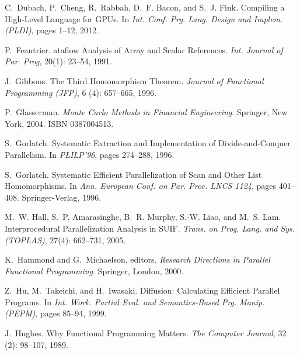 \documentclass{sigplanconf}  %
\begin{document}
\begin{thebibliography}{49}
C.~Dubach, P.~Cheng, R.~Rabbah, D.~F. Bacon, and S.~J. Fink.
\newblock Compiling a {H}igh-{L}evel {L}anguage for {GPU}s.
\newblock In \emph{Int. Conf. Prg. Lang. Design and Implem. (PLDI)}, pages
  1--12, 2012.

P.~Feautrier.
ataflow {A}nalysis of {A}rray and {S}calar {R}eferences.
\newblock \emph{Int. Journal of Par. Prog}, 20(1): 23--54, 1991.

J.~Gibbons.
\newblock The {T}hird {H}omomorphism {T}heorem.
\newblock \emph{Journal of Functional Programming (JFP)}, 6
  (4): 657--665, 1996.

P.~Glasserman.
\newblock \emph{Monte Carlo {M}ethods in {F}inancial {E}ngineering}.
\newblock Springer, New York, 2004.
\newblock ISBN 0387004513.

S.~Gorlatch.
\newblock Systematic {E}xtraction and {I}mplementation of
  {D}ivide-and-{C}onquer {P}arallelism.
\newblock In \emph{PLILP'96}, pages 274--288, 1996{}.

S.~Gorlatch.
\newblock Systematic {E}fficient {P}arallelization of {S}can and {O}ther {L}ist
  {H}omomorphisms.
\newblock In \emph{Ann. European Conf. on Par. Proc. LNCS 1124}, pages
  401--408. Springer-Verlag, 1996{}.

M.~W. Hall, S.~P. Amarasinghe, B.~R. Murphy, S.-W. Liao, and M.~S. Lam.
\newblock Interprocedural {P}arallelization {A}nalysis in {SUIF}.
\newblock \emph{Trans. on Prog. Lang. and Sys. (TOPLAS)}, 27(4):
  662--731, 2005.

K.~Hammond and G.~Michaelson, editors.
\newblock \emph{{Research Directions in Parallel Functional Programming}}.
\newblock Springer, London, 2000.

Z.~Hu, M.~Takeichi, and H.~Iwasaki.
\newblock Diffusion: {C}alculating {E}fficient {P}arallel {P}rograms.
\newblock In \emph{Int. Work. Partial Eval. and Semantics-Based Prg. Manip.
  (PEPM)}, pages 85--94, 1999.

J.~Hughes.
\newblock Why {F}unctional {P}rogramming {M}atters.
\newblock \emph{The Computer Journal}, 32 (2): 98--107, 1989.


\end{thebibliography}
\end{document}
